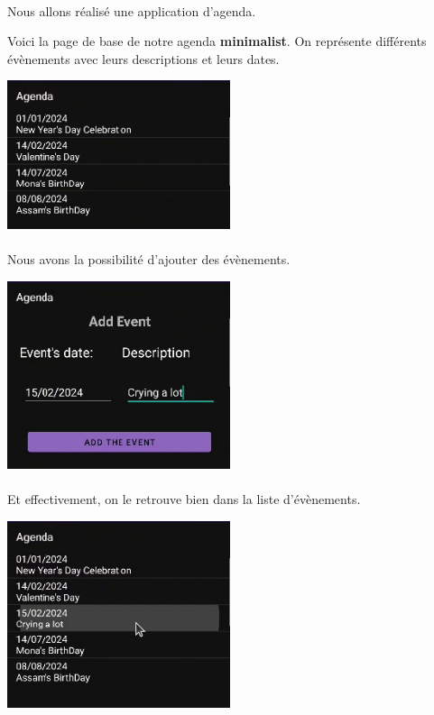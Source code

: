 \documentclass[a4paper]{article}
\begin{document}
\begin{multicols}{2}
    \paragraph{}
      Nous allons réalisé une application d'agenda.


      Voici la page de base de notre agenda \textbf{minimalist}. On représente différents évènements avec leurs descriptions et leurs dates. 

      \noindent\includegraphics[width=0.49\textwidth]{agenda/before}

    \paragraph{}
      Nous avons la possibilité d'ajouter des évènements.
      
      \noindent\includegraphics[width=0.49\textwidth]{agenda/add}

    \paragraph{}
      Et effectivement, on le retrouve bien dans la liste d'évènements.\newline

      \noindent\includegraphics[width=0.49\textwidth]{agenda/after}


\end{multicols}
\end{document}

